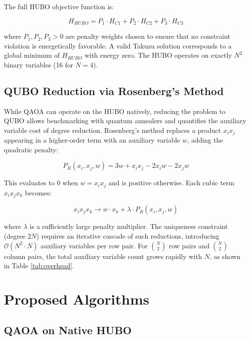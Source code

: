 \documentclass[eng]{ajceam-class}
\begin{document}
The full HUBO objective function is:

\begin{equation} \label{eq:full_hubo}
 H_{HUBO} = P_1 \cdot H_{C1} + P_2 \cdot H_{C2} + P_3 \cdot H_{C3}
\end{equation}

where $P_1, P_2, P_3 > 0$ are penalty weights chosen to ensure that no constraint violation is energetically favorable. A valid Takuzu solution corresponds to a global minimum of $H_{HUBO}$ with energy zero. The HUBO operates on exactly $N^2$ binary variables (16 for $N=4$).

\subsection{QUBO Reduction via Rosenberg's Method}

While QAOA can operate on the HUBO natively, reducing the problem to QUBO allows benchmarking with quantum annealers and quantifies the auxiliary variable cost of degree reduction. Rosenberg's method \cite{rosenberg1975reduction} replaces a product $x_i x_j$ appearing in a higher-order term with an auxiliary variable $w$, adding the quadratic penalty:

\begin{equation} \label{eq:rosenberg}
 P_{R}(x_i, x_j, w) = 3w + x_i x_j - 2x_i w - 2x_j w
\end{equation}

This evaluates to 0 when $w = x_i x_j$ and is positive otherwise. Each cubic term $x_i x_j x_k$ becomes:

\begin{equation}
 x_i x_j x_k \rightarrow w \cdot x_k + \lambda \cdot P_R(x_i, x_j, w)
\end{equation}

where $\lambda$ is a sufficiently large penalty multiplier. The uniqueness constraint (degree $2N$) requires an iterative cascade of such reductions, introducing $\mathcal{O}(N^2 \cdot N)$ auxiliary variables per row pair. For $\binom{N}{2}$ row pairs and $\binom{N}{2}$ column pairs, the total auxiliary variable count grows rapidly with $N$, as shown in Table \ref{tab:overhead}.

\section{Proposed Algorithms}

\subsection{QAOA on Native HUBO}
\end{document}
